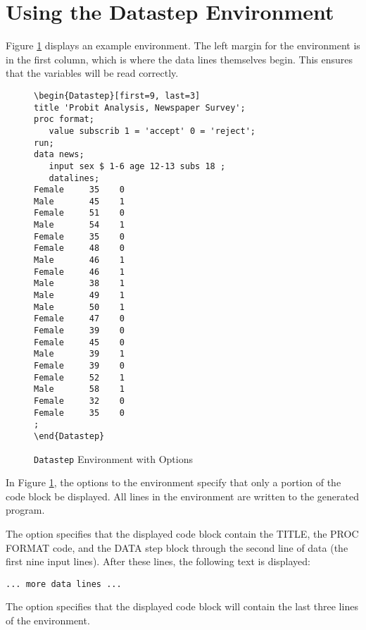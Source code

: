 \documentclass[article,oneside]{memoir}
\begin{document}
\section{Using the Datastep Environment}\label{dsex}

  Figure \ref{fig:sd2} displays an example  environment. The left margin for 
  the environment is in the first column, which is where the data lines themselves begin.
  This ensures that the variables will be read correctly.

\begin{figure}[H]
\begin{snugshade}
\begin{verbatim}
\begin{Datastep}[first=9, last=3]
title 'Probit Analysis, Newspaper Survey';
proc format;
   value subscrib 1 = 'accept' 0 = 'reject';
run;
data news;
   input sex $ 1-6 age 12-13 subs 18 ;
   datalines;
Female     35    0 
Male       45    1 
Female     51    0 
Male       54    1 
Female     35    0 
Female     48    0 
Male       46    1 
Female     46    1 
Male       38    1 
Male       49    1 
Male       50    1 
Female     47    0 
Female     39    0 
Female     45    0 
Male       39    1 
Female     39    0 
Female     52    1 
Male       58    1 
Female     32    0 
Female     35    0 
;
\end{Datastep}
\end{verbatim}
\end{snugshade}
\caption{\texttt{Datastep} Environment with Options}\label{fig:sd2}
\end{figure}
  
  In Figure \ref{fig:sd2}, the options to the  environment specify that only a portion
  of the code block be displayed.  All lines in the environment are written to the 
  generated program.
  
  The option  specifies that the displayed code
  block contain the TITLE, the PROC FORMAT code, and the DATA step block through the
  second line of data (the first nine input lines). After these lines, the 
  following text is displayed:\par\texttt{... more data lines ...}
  
  The option  specifies that the displayed code block
  will contain the last three lines of the environment.
  
\end{document}
